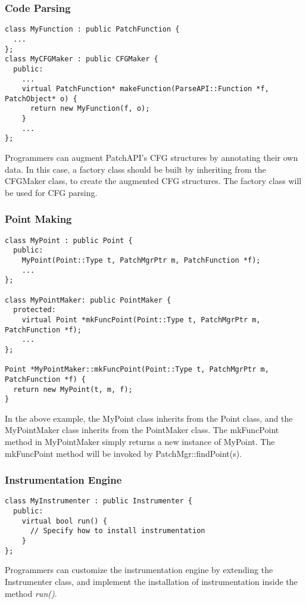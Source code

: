 \subsubsection{Code Parsing}
\lstset{numbers=left}
\begin{lstlisting}[caption=Example of customizing CFG parsing]
class MyFunction : public PatchFunction {
  ...
};
class MyCFGMaker : public CFGMaker {
  public:
    ...
    virtual PatchFunction* makeFunction(ParseAPI::Function *f, PatchObject* o) {
      return new MyFunction(f, o);
    }
    ...
};
\end{lstlisting}
Programmers can augment PatchAPI's CFG structures by annotating their own data.
In this case, a factory class should be built by inheriting from the
CFGMaker class, to create the augmented CFG structures. The factory class will
be used for CFG parsing.

\subsubsection{Point Making}
\lstset{numbers=left}
\begin{lstlisting}[caption=Example of point making]
class MyPoint : public Point {
  public:
    MyPoint(Point::Type t, PatchMgrPtr m, PatchFunction *f);
    ...
};

class MyPointMaker: public PointMaker {
  protected:
    virtual Point *mkFuncPoint(Point::Type t, PatchMgrPtr m, PatchFunction *f);
    ...
};

Point *MyPointMaker::mkFuncPoint(Point::Type t, PatchMgrPtr m, PatchFunction *f) {
  return new MyPoint(t, m, f);
}
\end{lstlisting}
In the above example, the MyPoint class inherits from the Point class, and the
MyPointMaker class inherits from the PointMaker class. The mkFuncPoint method in
MyPointMaker simply returns a new instance of MyPoint. The mkFuncPoint method
will be invoked by PatchMgr::findPoint(s).


\subsubsection{Instrumentation Engine}
\lstset{numbers=left}
\begin{lstlisting}[caption=Example of customizing instrumentation engine]
class MyInstrumenter : public Instrumenter {
  public:
    virtual bool run() {
      // Specify how to install instrumentation
    }
};
\end{lstlisting}
Programmers can customize the instrumentation engine by extending the
Instrumenter class, and implement the installation of instrumentation inside the
method \emph{run()}.

